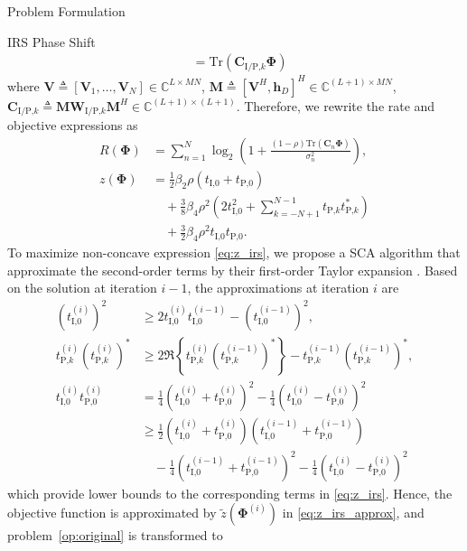 \documentclass[journal]{IEEEtran}
\begin{document}
\begin{section}{Problem Formulation}
\begin{subsection}{IRS Phase Shift}
\begin{align}
				& = \mathrm{Tr}(\boldsymbol{C}_{\text{I/P,}k}\boldsymbol{\Phi})
			\end{align}
			where $\boldsymbol{V} \triangleq [\boldsymbol{V}_1,\dots,\boldsymbol{V}_N] \in \mathbb{C}^{L \times MN}$, $\boldsymbol{M} \triangleq [\boldsymbol{V}^H, \boldsymbol{h}_{D}]^H \in \mathbb{C}^{(L+1) \times MN}$, $\boldsymbol{C}_{\text{I/P,}k} \triangleq \boldsymbol{M}\boldsymbol{W}_{\text{I/P,}k}\boldsymbol{M}^H \in \mathbb{C}^{(L+1)\times(L+1)}$. Therefore, we rewrite the rate and objective expressions as
			\begin{align}
				R(\boldsymbol{\Phi})
				& = \sum_{n=1}^{N}{\log_2\left(1+\frac{(1-\rho)\mathrm{Tr}(\boldsymbol{C}_n\boldsymbol{\Phi})}{\sigma_n^2}\right)},\label{eq:R_irs}\\
				z(\boldsymbol{\Phi})
				& = \frac{1}{2}{\beta_2}{\rho}(t_{\text{I,}0}+t_{\text{P,}0})\nonumber\\
				& \quad + \frac{3}{8}{\beta_4}{\rho^2} \left(2t_{\text{I,}0}^2 + \sum_{k=-N+1}^{N-1}{t_{\text{P,}k}t_{\text{P,}k}^*}\right)\nonumber\\
				& \quad + \frac{3}{2}{\beta_4}{\rho^2}t_{\text{I,}0}t_{\text{P,}0}.\label{eq:z_irs}
			\end{align}
			To maximize non-concave expression \eqref{eq:z_irs}, we propose a SCA algorithm that approximate the second-order terms by their first-order Taylor expansion \cite{Adali2010}. Based on the solution at iteration $i - 1$, the approximations at iteration $i$ are
			\begin{align}
				(t_{\text{I,}0}^{(i)})^2
				& \ge 2 t_{\text{I,}0}^{(i)}t_{\text{I,}0}^{(i-1)} - (t_{\text{I,}0}^{(i-1)})^2,\label{eq:taylor_1}\\
				t_{\text{P,}k}^{(i)} (t_{\text{P,}k}^{(i)})^*
				& \ge 2 \Re\left\{t_{\text{P,}k}^{(i)} (t_{\text{P,}k}^{(i-1)})^*\right\} - t_{\text{P,}k}^{(i-1)} (t_{\text{P,}k}^{(i-1)})^*,\label{eq:taylor_2}\\
				t_{\text{I,}0}^{(i)} t_{\text{P,}0}^{(i)}
				& = \frac{1}{4}(t_{\text{I,}0}^{(i)} + t_{\text{P,}0}^{(i)})^2 - \frac{1}{4}(t_{\text{I,}0}^{(i)} - t_{\text{P,}0}^{(i)})^2\nonumber\\
				& \ge \frac{1}{2}(t_{\text{I,}0}^{(i)} + t_{\text{P,}0}^{(i)})(t_{\text{I,}0}^{(i-1)} + t_{\text{P,}0}^{(i-1)})\nonumber\\
				& \quad - \frac{1}{4}(t_{\text{I,}0}^{(i-1)} + t_{\text{P,}0}^{(i-1)})^2 - \frac{1}{4}(t_{\text{I,}0}^{(i)} - t_{\text{P,}0}^{(i)})^2\label{eq:taylor_3}
			\end{align}
			which provide lower bounds to the corresponding terms in \eqref{eq:z_irs}. Hence, the objective function is approximated by $\tilde{z}(\boldsymbol{\Phi}^{(i)})$ in \eqref{eq:z_irs_approx}, and problem~\eqref{op:original} is transformed to

\end{subsection}
\end{section}
\end{document}
